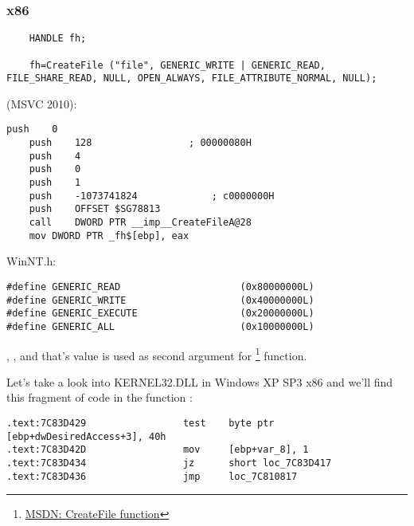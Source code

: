 \subsubsection{x86}


\begin{lstlisting}
	HANDLE fh;

	fh=CreateFile ("file", GENERIC_WRITE | GENERIC_READ, FILE_SHARE_READ, NULL, OPEN_ALWAYS, FILE_ATTRIBUTE_NORMAL, NULL);
\end{lstlisting}

 (MSVC 2010):

\begin{lstlisting}[caption=MSVC 2010]
	push	0
	push	128					; 00000080H
	push	4
	push	0
	push	1
	push	-1073741824				; c0000000H
	push	OFFSET $SG78813
	call	DWORD PTR __imp__CreateFileA@28
	mov	DWORD PTR _fh$[ebp], eax
\end{lstlisting}

 WinNT.h:

\begin{lstlisting}[caption=WinNT.h]
#define GENERIC_READ                     (0x80000000L)
#define GENERIC_WRITE                    (0x40000000L)
#define GENERIC_EXECUTE                  (0x20000000L)
#define GENERIC_ALL                      (0x10000000L)
\end{lstlisting}

, 
, 
{and that's value is used as second argument for} \footnote{\href{http://msdn.microsoft.com/en-us/library/aa363858(VS.85).aspx}{MSDN: CreateFile function}} function.


{Let's take a look into KERNEL32.DLL in Windows XP SP3 x86 and we'll find
this fragment of code in the function :}

\begin{lstlisting}[caption=KERNEL32.DLL (Windows XP SP3 x86)]
.text:7C83D429                 test    byte ptr [ebp+dwDesiredAccess+3], 40h
.text:7C83D42D                 mov     [ebp+var_8], 1
.text:7C83D434                 jz      short loc_7C83D417
.text:7C83D436                 jmp     loc_7C810817
\end{lstlisting}

